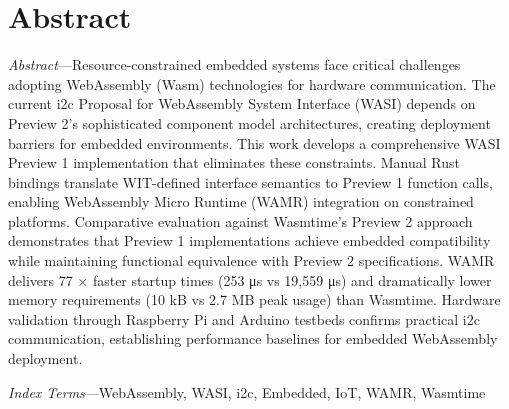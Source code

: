 \chapter*{Abstract}










\textit{Abstract}---Resource-constrained embedded systems face critical challenges adopting WebAssembly (Wasm) technologies for hardware communication. The current \acrshort{i2c} Proposal for WebAssembly System Interface (WASI) depends on Preview 2’s sophisticated component model architectures, creating deployment barriers for embedded environments. This work develops a comprehensive WASI Preview 1 implementation  that eliminates these constraints. Manual Rust bindings translate WIT-defined interface semantics to Preview 1 function calls, enabling WebAssembly Micro Runtime (WAMR) integration on constrained platforms. Comparative evaluation against Wasmtime’s Preview 2 approach demonstrates that Preview 1 implementations achieve embedded compatibility while maintaining functional equivalence with Preview 2 specifications. WAMR delivers 77 × faster startup times (253 μs vs 19,559 μs) and dramatically lower memory requirements (10 kB vs 2.7 MB peak usage) than Wasmtime. Hardware validation through Raspberry Pi and Arduino testbeds confirms practical \acrshort{i2c} communication, establishing performance baselines for embedded WebAssembly deployment.

\textit{Index Terms}---WebAssembly, WASI, \acrshort{i2c}, Embedded, IoT,
WAMR, Wasmtime
